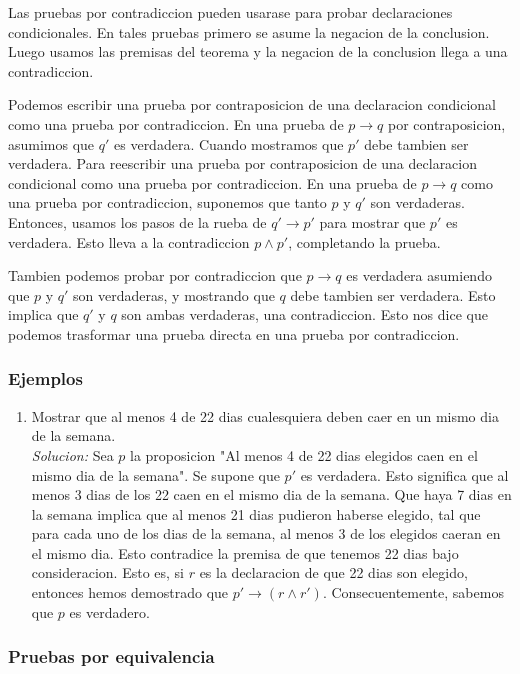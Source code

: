 \documentclass[]{article}
\begin{document}
Las pruebas por contradiccion pueden usarase para probar declaraciones condicionales. En tales pruebas primero se asume la negacion de la conclusion. Luego usamos las premisas del teorema y  la negacion de la conclusion llega a una contradiccion.

Podemos escribir una prueba por contraposicion de una declaracion condicional como una prueba por contradiccion. En una prueba de $p \rightarrow q$ por contraposicion, asumimos que $q'$ es verdadera. Cuando mostramos que $p'$ debe tambien ser verdadera. Para reescribir una prueba por contraposicion de una declaracion condicional como una prueba por contradiccion. En una prueba de $p \rightarrow q$ como una prueba por contradiccion, suponemos que tanto $p$ y $q'$ son verdaderas. Entonces, usamos los pasos de la rueba de $q' \rightarrow p'$ para mostrar que $p'$ es verdadera. Esto lleva a la contradiccion $p \wedge p'$,  completando la prueba.

Tambien podemos probar por contradiccion que $p \rightarrow q$ es verdadera asumiendo que $p$ y $q'$ son verdaderas, y mostrando que $q$ debe tambien ser verdadera. Esto implica que $q'$ y $q$ son ambas verdaderas, una contradiccion. Esto nos dice que podemos trasformar una prueba directa en una prueba por contradiccion. 
\subsubsection*{Ejemplos}

\begin{enumerate}
	\item Mostrar que al menos 4 de 22 dias cualesquiera deben caer en un mismo dia de  la semana.\\
	\textit{Solucion:} Sea $p$ la proposicion "Al menos 4 de 22 dias elegidos caen en el mismo dia de la semana". Se supone que $p'$ es verdadera. Esto significa que al menos 3 dias de los 22 caen en el mismo dia de la semana. Que haya 7 dias en la semana implica que al menos 21 dias pudieron haberse elegido, tal que para cada uno de los dias de la semana, al menos 3 de los elegidos caeran en el mismo dia. Esto contradice la premisa de que tenemos 22 dias bajo consideracion. Esto es, si $r$ es la declaracion de que 22 dias son elegido, entonces hemos demostrado que $p' \rightarrow (r \wedge r')$. Consecuentemente, sabemos que $p$ es verdadero.
\end{enumerate}

\subsubsection*{Pruebas por equivalencia}
\end{document}
